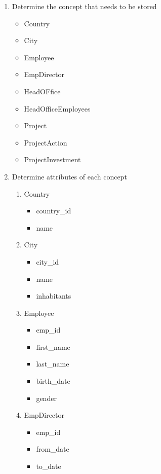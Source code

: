 \documentclass[]{article}
\begin{document}
\begin{enumerate}

\item Determine the concept that needs to be stored

\begin{itemize}
\item Country
\item City
\item Employee
\item EmpDirector
\item HeadOFfice
\item HeadOfficeEmployees
\item Project
\item ProjectAction
\item ProjectInvestment
\end{itemize}

\item Determine attributes of each concept

\begin{enumerate}
\item Country
\begin{itemize}
\item country\_id
\item name
\end{itemize}

\item City
\begin{itemize}
\item city\_id
\item name
\item inhabitants
\end{itemize}

\item Employee
\begin{itemize}
\item emp\_id
\item first\_name
\item last\_name
\item birth\_date
\item gender
\end{itemize}

\item EmpDirector
\begin{itemize}
\item emp\_id
\item from\_date
\item to\_date
\end{itemize}


\end{enumerate}
\end{enumerate}
\end{document}
